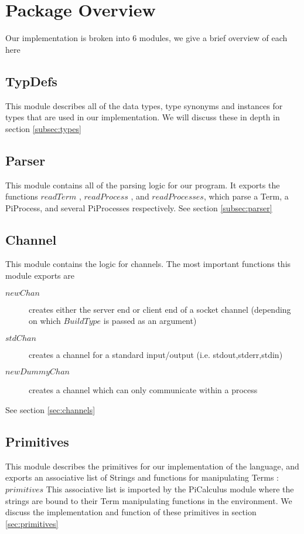 \section{Package Overview}

Our implementation is broken into 6 modules, we give a brief overview of each here

\subsection{TypDefs}

This module describes all of the data types, type synonyms and instances for types that are used in our implementation. We will discuss these in depth in section \ref{subsec:types}

\subsection{Parser}

This module contains all of the parsing logic for our program. It exports the functions $readTerm$ , $readProcess$ , and $readProcesses$, which parse a Term, a PiProcess, and several PiProcesses respectively. See section \ref{subsec:parser}

\subsection{Channel}

This module contains the logic for channels. The most important functions this module exports are

\begin{description}
    \item[$newChan$] creates either the server end or client end of a socket channel (depending on which $BuildType$ is passed as an argument) 
    \item[$stdChan$] creates a channel for a standard input/output (i.e. stdout,stderr,stdin)
    \item[$newDummyChan$] creates a channel which can only communicate within a process
\end{description}

See section \ref{sec:channels}

\subsection{Primitives}

This module describes the primitives for our implementation of the language, and exports an associative list of Strings and functions for manipulating Terms : $primitives$
This associative list is imported by the PiCalculus module where the strings are bound to their Term manipulating functions in the environment. We discuss the implementation and function of these primitives in section \ref{sec:primitives}

